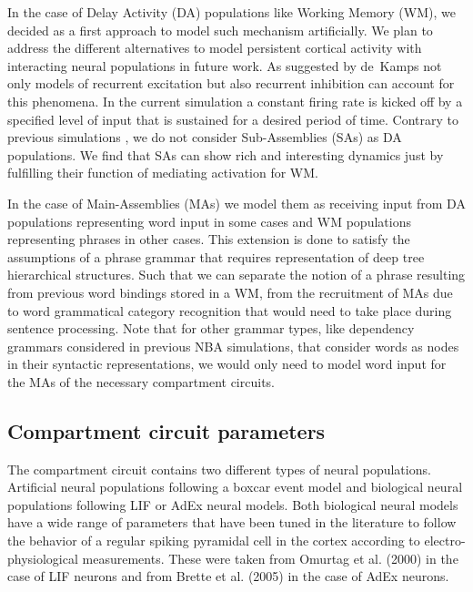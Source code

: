 \documentclass[10pt]{article}
\begin{document}
{In the case of Delay Activity (DA) populations like Working Memory (WM), we decided as a first approach to model such mechanism artificially.
We plan to address the different alternatives to model persistent cortical activity with interacting neural populations in future work.
As suggested by de~Kamps\cite{de_Kamps_2005} not only models of recurrent excitation but also recurrent inhibition can account for this phenomena.
In the current simulation a constant firing rate is kicked off by a specified level of input that is sustained for a desired period of time.
Contrary to previous simulations \cite{velde2015ambiguity}, we do not consider Sub-Assemblies (SAs) as DA populations.
We find that SAs can show rich and interesting dynamics just by fulfilling their function of mediating activation for WM.

In the case of Main-Assemblies (MAs) we model them as receiving input from DA populations representing word input in some cases and WM populations representing phrases in other cases.
This extension is done to satisfy the assumptions of a phrase grammar that requires representation of deep tree hierarchical structures. Such that we can separate the notion of a phrase resulting from previous word bindings stored in a WM, from the recruitment of MAs due to word grammatical category recognition that would need to take place during sentence processing.
Note that for other grammar types, like dependency grammars considered in previous NBA simulations\cite{velde2015ambiguity}, that consider words as nodes in their syntactic representations, we would only need to model word input for the MAs of the necessary compartment circuits.


\subsection{Compartment circuit parameters}\label{compartment-circuit-parameters}

The compartment circuit contains two different types of neural populations.
Artificial neural populations following a boxcar event model and biological neural populations following LIF or AdEx neural models.
Both biological neural models have a wide range of parameters that have been tuned in the literature to follow the behavior of a regular spiking pyramidal cell in the cortex according to electro-physiological measurements.
These were taken from Omurtag et al. (2000) \cite{omurtag2000simulation} in the case of LIF neurons and from Brette et al.
(2005) \cite{Brette_2005} in the case of AdEx neurons.


}
\end{document}
